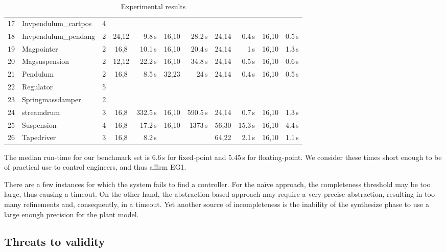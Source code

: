 \documentclass[twocolumn]{autart}    %
\newcommand{\xmark}{\ding{55}}
\begin{document}
\begin{table}
\begin{tabular}{| r | l | c | c | r | c | r | c | r | c | r |}
17 & Invpendulum\_cartpos & 4 & & ~\xmark & & ~\xmark & & ~\xmark & & ~\xmark\\
18 & Invpendulum\_pendang & 2 & 24,12 & 9.8\,s & 16,10 & 28.2\,s & 24,14 & 0.4\,s & 16,10 & 0.5\,s\\
19 & Magpointer   & 2 & 16,8 & 10.1\,s & 16,10 & 20.4\,s & 24,14  & 1\,s& 16,10 & 1.3\,s\\
20 & Magsuspension  & 2 & 12,12  & 22.2\,s  & 16,10 & 34.8\,s & 24,14 & 0.5\,s & 16,10 & 0.6\,s\\
21 & Pendulum   & 2 & 16,8 & 8.5\,s & 32,23 & 24\,s & 24,14 & 0.4\,s & 16,10 & 0.5\,s\\
22 & Regulator   & 5 & & ~\xmark & & ~\xmark & & ~\xmark & & ~\xmark\\
23 & Springmassdamper & 2 & & ~\xmark & & ~\xmark & & ~\xmark & & ~\xmark\\
24 & streamdrum   & 3 & 16,8  & 332.5\,s & 16,10 & 590.5\,s & 24,14 & 0.7\,s & 16,10 &1.3\,s\\
25 & Suspension  & 4 & 16,8  & 17.2\,s & 16,10 &1373\,s & 56,30 & 15.3\,s & 16,10 & 4.4\,s\\
26 & Tapedriver   & 3 & 16,8  & 8.2\,s & & ~\xmark & 64,22 & 2.1\,s & 16,10 & 1.1\,s\\
\hline
%
\end{tabular}
\vspace{0.05in}
\caption{Experimental results\label{tab:results}}
\end{table}

The median run-time for our benchmark set is 6.6\,s for fixed-point and 5.45\,s for floating-point. 
We consider these times short enough to be of practical use to control engineers, and thus affirm EG1.

There are a few instances for which the system fails to find a controller. 
For the na\"ive approach, the completeness threshold may be too large, thus
causing a timeout.  On the other hand, the abstraction-based approach may
require a very precise abstraction, resulting in too many refinements and,
consequently, in a timeout.  Yet another source of incompleteness is the
inability of the {\sc synthesize} phase to use a large enough precision for
the plant model.

\subsection{Threats to validity}
\label{exp:threats-to-validity}
\end{document}
